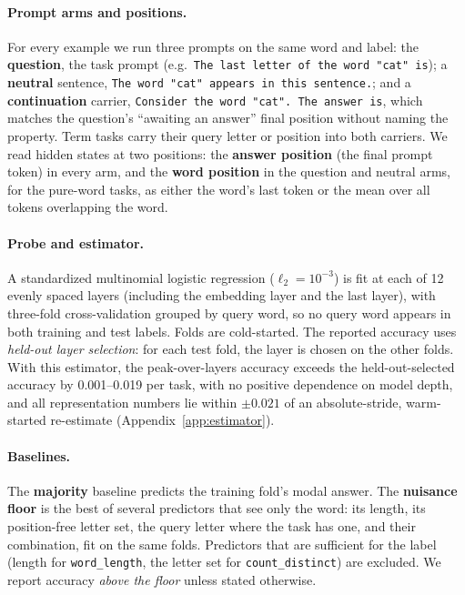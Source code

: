 \paragraph{Prompt arms and positions.}
For every example we run three prompts on the same word and label:
the \textbf{question}, the task prompt (e.g.\ \texttt{The last letter of the word "cat" is});
a \textbf{neutral} sentence, \texttt{The word "cat" appears in this sentence.}; and a
\textbf{continuation} carrier, \texttt{Consider the word "cat". The answer is}, which matches the
question's ``awaiting an answer'' final position without naming the property. Term tasks carry
their query letter or position into both carriers. We read hidden states at two positions: the
\textbf{answer position} (the final prompt token) in every arm, and the \textbf{word position} in
the question and neutral arms, for the pure-word tasks, as either the word's last token or the mean
over all tokens overlapping the word.

\paragraph{Probe and estimator.}
A standardized multinomial logistic regression ($\ell_2 = 10^{-3}$) is fit at each of 12 evenly
spaced layers (including the embedding layer and the last layer), with three-fold cross-validation
grouped by query word, so no query word appears in both training and test labels. Folds are
cold-started. The reported accuracy uses \emph{held-out layer selection}: for each test fold, the
layer is chosen on the other folds. With this estimator, the peak-over-layers accuracy exceeds the
held-out-selected accuracy by 0.001--0.019 per task, with no positive dependence on model depth,
and all representation numbers lie within $\pm 0.021$ of an absolute-stride, warm-started
re-estimate (Appendix~\ref{app:estimator}).

\paragraph{Baselines.}
The \textbf{majority} baseline predicts the training fold's modal answer. The \textbf{nuisance
floor} is the best of several predictors that see only the word: its length, its position-free
letter set, the query letter where the task has one, and their combination, fit on the same folds.
Predictors that are sufficient for the label (length for \texttt{word\_length}, the letter set for
\texttt{count\_distinct}) are excluded. We report accuracy \emph{above the floor} unless stated
otherwise.

